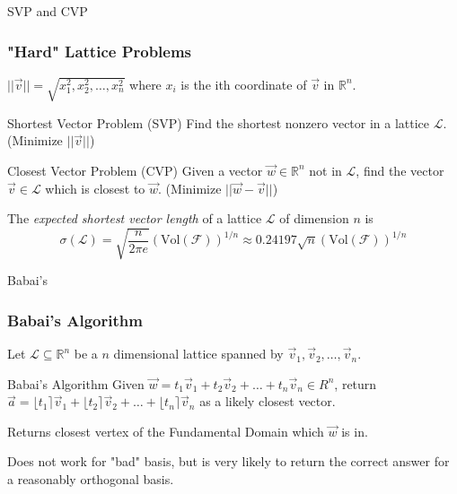 \documentclass[12pt]{beamer}
\begin{document}
\begin{frame}{SVP and CVP}
    \frametitle{"Hard" Lattice Problems}
    $\lvert\lvert \vec{v}\rvert\rvert = \sqrt{x_1^2,x_2^2,\dots,x_n^2}$ where $x_i$ is the ith coordinate of $\vec{v}$ in $\mathbb{R}^n$.
    \begin{alertblock}{Shortest Vector Problem (SVP)}
        Find the shortest nonzero vector in a lattice $\mathcal{L}$. (Minimize $\lvert\lvert \vec{v}\rvert\rvert$)
    \end{alertblock}
    \begin{alertblock}{Closest Vector Problem (CVP)}
        Given a vector $\vec{w}\in\mathbb{R}^n$ not in $\mathcal{L}$, find the vector $\vec{v}\in\mathcal{L}$ which is closest to $\vec{w}$. (Minimize $\lvert\lvert \vec{w} - \vec{v}\rvert\rvert$)
    \end{alertblock}
    The \textit{expected shortest vector length} of a lattice $\mathcal{L}$ of dimension $n$ is
    $$\sigma(\mathcal{L}) = \sqrt{\frac{n}{2\pi e}}(\text{Vol}(\mathcal{F}))^{1/n} \approx 0.24197\sqrt{n}(\text{Vol}(\mathcal{F}))^{1/n}$$
\end{frame}

\begin{frame}{Babai's}
    \frametitle{Babai's Algorithm}
    Let $\mathcal{L}\subseteq\mathbb{R}^n$ be a $n$ dimensional lattice spanned by $\vec{v}_1,\vec{v}_2,\dots,\vec{v}_n$.
    \begin{block}{Babai's Algorithm}
        Given $\vec{w} = t_1\vec{v}_1 + t_2\vec{v}_2 + \dots + t_n\vec{v}_n \in R^n$, return $\vec{a}=\lfloor t_1\rceil\vec{v}_1 + \lfloor t_2\rceil\vec{v}_2 + \dots + \lfloor t_n\rceil\vec{v}_n$ as a likely closest vector.
    \end{block}
    
    Returns closest vertex of the Fundamental Domain which $\vec{w}$ is in.
    
    Does not work for "bad" basis, but is very likely to return the correct answer for a reasonably orthogonal basis.
    
\end{frame}
\end{document}
